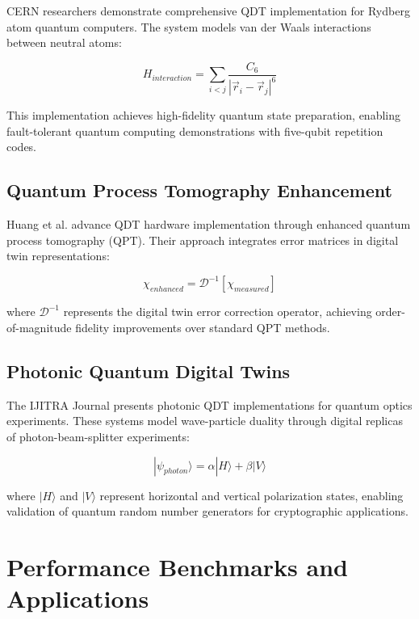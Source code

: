 CERN researchers \cite{pagano2024ab} demonstrate comprehensive QDT implementation for Rydberg atom quantum computers. The system models van der Waals interactions between neutral atoms:

\begin{equation}
H_{interaction} = \sum_{i<j} \frac{C_6}{|\vec{r}_i - \vec{r}_j|^6}
\end{equation}

This implementation achieves high-fidelity quantum state preparation, enabling fault-tolerant quantum computing demonstrations with five-qubit repetition codes.

\subsection{Quantum Process Tomography Enhancement}

Huang et al. \cite{huang2024quantum} advance QDT hardware implementation through enhanced quantum process tomography (QPT). Their approach integrates error matrices in digital twin representations:

\begin{equation}
\chi_{enhanced} = \mathcal{D}^{-1}[\chi_{measured}]
\end{equation}

where $\mathcal{D}^{-1}$ represents the digital twin error correction operator, achieving order-of-magnitude fidelity improvements over standard QPT methods.

\subsection{Photonic Quantum Digital Twins}

The IJITRA Journal \cite{ijitra2024photon} presents photonic QDT implementations for quantum optics experiments. These systems model wave-particle duality through digital replicas of photon-beam-splitter experiments:

\begin{equation}
|\psi_{photon}\rangle = \alpha|H\rangle + \beta|V\rangle
\end{equation}

where $|H\rangle$ and $|V\rangle$ represent horizontal and vertical polarization states, enabling validation of quantum random number generators for cryptographic applications.

\section{Performance Benchmarks and Applications}

